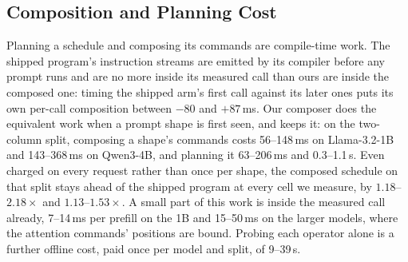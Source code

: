 \subsection{Composition and Planning Cost}
\label{app:overheads}

Planning a schedule and composing its commands are compile-time work.
The shipped program's instruction streams are emitted by its compiler before any prompt runs and are no more inside its measured call than ours are inside the composed one: timing the shipped arm's first call against its later ones puts its own per-call composition between $-80$ and $+87$\,ms.
Our composer does the equivalent work when a prompt shape is first seen, and keeps it: on the two-column split, composing a shape's commands costs 56--148\,ms on Llama-3.2-1B and 143--368\,ms on Qwen3-4B, and planning it 63--206\,ms and 0.3--1.1\,s.
Even charged on every request rather than once per shape, the composed schedule on that split stays ahead of the shipped program at every cell we measure, by $1.18$--$2.18\times$ and $1.13$--$1.53\times$.
A small part of this work is inside the measured call already, 7--14\,ms per prefill on the 1B and 15--50\,ms on the larger models, where the attention commands' positions are bound.
Probing each operator alone is a further offline cost, paid once per model and split, of 9--39\,s.

